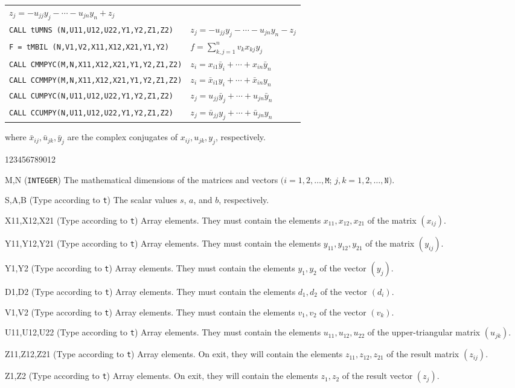 \begin{flushleft}
\begin{tabular}{@{}l@{\qquad}l@{}}
$z_j=-u_{jj}y_j-\cdots-u_{jn}y_n+z_j$ \\
{\tt CALL tUMNS (N,U11,U12,U22,Y1,Y2,Z1,Z2)} &
$z_j=-u_{jj}y_j-\cdots-u_{jn}y_n-z_j$ \\
{\tt F =  tMBIL (N,V1,V2,X11,X12,X21,Y1,Y2)} &
$f = \sum_{k,j = 1}^n v_kx_{kj}y_j$ \\
{\tt CALL CMMPYC(M,N,X11,X12,X21,Y1,Y2,Z1,Z2)} &
$z_i=x_{i1}\bar{y}_i+\cdots+x_{in}\bar{y}_n$ \\
{\tt CALL CCMMPY(M,N,X11,X12,X21,Y1,Y2,Z1,Z2)} &
$z_i=\bar{x}_{i1}y_i+\cdots+\bar{x}_{in}y_n$ \\
{\tt CALL CUMPYC(N,U11,U12,U22,Y1,Y2,Z1,Z2)} &
$z_j=u_{jj}\bar{y}_j+\cdots+u_{jn}\bar{y}_n$ \\
{\tt CALL CCUMPY(N,U11,U12,U22,Y1,Y2,Z1,Z2)} &
$z_j=\bar{u}_{jj}y_j+\cdots+\bar{u}_{jn}y_n$ \\
\end{tabular}
\end{flushleft}
where $\bar{x}_{ij}, \bar{u}_{jk}, \bar{y}_j$
are the complex conjugates of $x_{ij}, u_{jk}, y_j$, respectively.
\begin{DLtt}{123456789012}
\item[M,N] ({\tt INTEGER}) The mathematical dimensions of the matrices
and vectors $(i = 1,2,\ldots,\mathtt{M}$;
$j,k = 1,2,\ldots,\mathtt{N})$.
\item[S,A,B] (Type according to {\tt t}) The scalar values $s$, $a$,
and $b$, respectively.
\item[X11,X12,X21] (Type according to {\tt t}) Array elements. They must
contain the elements $x_{11},x_{12},x_{21}$ of the matrix $(x_{ij})$.
\item[Y11,Y12,Y21] (Type according to {\tt t}) Array elements. They must
contain the elements $y_{11},y_{12},y_{21}$ of the matrix $(y_{ij})$.
\item[Y1,Y2] (Type according to {\tt t}) Array elements. They
must contain the elements $y_1,y_2$ of the vector $(y_j)$.
\item[D1,D2] (Type according to {\tt t}) Array elements. They
must contain the elements $d_1,d_2$ of the vector $(d_i)$.
\item[V1,V2] (Type according to {\tt t}) Array elements. They
must contain the elements $v_1,v_2$ of the vector $(v_k)$.
\item[U11,U12,U22] (Type according to {\tt t}) Array elements. They must
contain the elements $u_{11},u_{12},u_{22}$ of the
upper-triangular matrix $(u_{jk})$.
\item[Z11,Z12,Z21] (Type according to {\tt t}) Array elements.
On exit, they will contain the elements $z_{11},z_{12},z_{21}$
of the result matrix $(z_{ij})$.
\item[Z1,Z2] (Type according to {\tt t}) Array elements. On exit, they
will contain the elements $z_1,z_2$ of the result vector $(z_j)$.
\end{DLtt}
